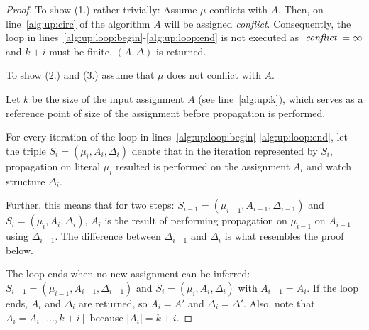 \documentclass{vutinfth} %
\theoremstyle{example}
\theoremstyle{definition}
\theoremstyle{theorem}
\theoremstyle{lemma}
\theoremstyle{corollary}
\newcommand{\ass}{A}
\newcommand{\sgl}{\mu}
\begin{document}
\begin{proof}


To show (1.) rather trivially: Assume $\sgl$ conflicts with $\ass$. Then, on line~\ref{alg:up:circ} of the algorithm $\ass$ will be assigned \emph{conflict}. Consequently, the loop in lines~\ref{alg:up:loop:begin}-\ref{alg:up:loop:end} is not executed as $|\emph{conflict}| = \infty$ and $k + i$ must be finite. $(\ass, \Delta)$ is returned.

To show (2.) and (3.) assume that $\sgl$ does not conflict with $\ass$.

Let $k$ be the size of the input assignment $\ass$ (see line~\ref{alg:up:k}), which serves as a reference point of size of the assignment before propagation is performed.


For every iteration of the loop in lines~\ref{alg:up:loop:begin}-\ref{alg:up:loop:end}, let the triple $S_i = (\sgl_i, \ass_i,  \Delta_i)$ denote that in the iteration represented by $S_i$, propagation on literal $\sgl_i$ resulted is performed on the assignment $A_i$ and watch structure $\Delta_i$.

Further, this means that for two steps: $S_{i-1} = (\sgl_{i-1}, \ass_{i-1}, \Delta_{i-1})$ and $S_i = (\sgl_i, \ass_i, \Delta_i)$, $\ass_i$ is the result of performing propagation on $\sgl_{i-1}$ on $\ass_{i-1}$ using $\Delta_{i-1}$. The difference between $\Delta_{i-1}$ and $\Delta_i$ is what resembles the proof below.

The loop ends when no new assignment can be inferred: $S_{i-1} = (\sgl_{i-1}, \ass_{i-1}, \Delta_{i-1})$ and $S_i = (\sgl_i, \ass_i, \Delta_i)$ with $\ass_{i-1} = \ass_i$. If the loop ends, $\ass_i$ and $\Delta_i$ are returned, so $\ass_i = \ass'$ and $\Delta_i = \Delta'$. Also, note that $\ass_i = \ass_i[\ldots, k+i]$ because $|\ass_i| = k+i$.


\end{proof}
\end{document}
